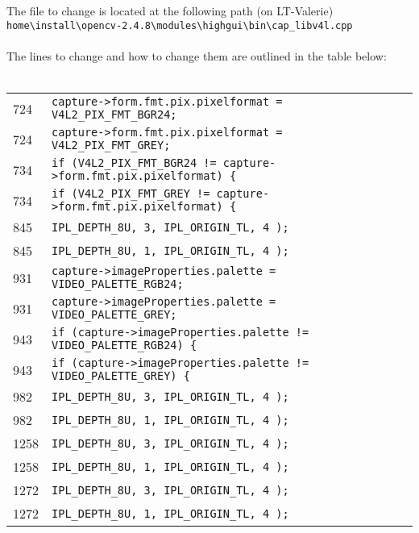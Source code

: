 \documentclass[fullpage]{report}
\begin{document}
The file to change is located at the following path (on LT-Valerie)\\
\verb|home\install\opencv-2.4.8\modules\highgui\bin\cap_libv4l.cpp| \\
\\
The lines to change and how to change them are outlined in the table below: \\
\\
\begin{tabular}{l | l | l}
\hline
724 & \verb|capture->form.fmt.pix.pixelformat = V4L2_PIX_FMT_BGR24;| \\
724 & \verb|capture->form.fmt.pix.pixelformat = V4L2_PIX_FMT_GREY;| \\ \hline
734 & \verb|if (V4L2_PIX_FMT_BGR24 != capture->form.fmt.pix.pixelformat) {|\\
734 & \verb|if (V4L2_PIX_FMT_GREY != capture->form.fmt.pix.pixelformat) {|\\ \hline
845 & \verb|IPL_DEPTH_8U, 3, IPL_ORIGIN_TL, 4 );|\\
845 & \verb|IPL_DEPTH_8U, 1, IPL_ORIGIN_TL, 4 );|\\ \hline
931 & \verb|capture->imageProperties.palette = VIDEO_PALETTE_RGB24;| \\
931 & \verb|capture->imageProperties.palette = VIDEO_PALETTE_GREY;| \\ \hline
943 & \verb|if (capture->imageProperties.palette != VIDEO_PALETTE_RGB24) {| \\
943 & \verb|if (capture->imageProperties.palette != VIDEO_PALETTE_GREY) {| \\ \hline
982 & \verb|IPL_DEPTH_8U, 3, IPL_ORIGIN_TL, 4 );|\\
982 & \verb|IPL_DEPTH_8U, 1, IPL_ORIGIN_TL, 4 );|\\ \hline
1258 & \verb|IPL_DEPTH_8U, 3, IPL_ORIGIN_TL, 4 );|\\
1258 & \verb|IPL_DEPTH_8U, 1, IPL_ORIGIN_TL, 4 );|\\ \hline
1272 & \verb|IPL_DEPTH_8U, 3, IPL_ORIGIN_TL, 4 );|\\
1272 & \verb|IPL_DEPTH_8U, 1, IPL_ORIGIN_TL, 4 );|\\ \hline


\end{tabular}
\end{document}
